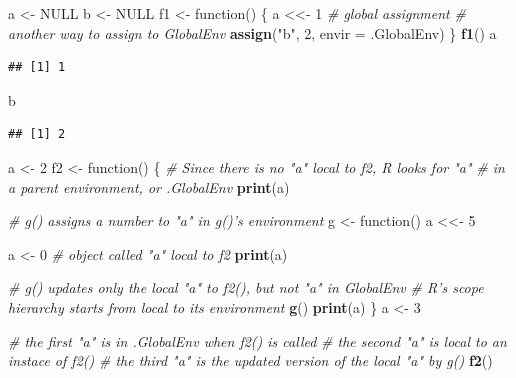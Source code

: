 \documentclass[]{book}
\newenvironment{Shaded}{\begin{snugshade}}{\end{snugshade}}
\newcommand{\KeywordTok}[1]{\textcolor[rgb]{0.13,0.29,0.53}{\textbf{{#1}}}}
\newcommand{\DataTypeTok}[1]{\textcolor[rgb]{0.13,0.29,0.53}{{#1}}}
\newcommand{\DecValTok}[1]{\textcolor[rgb]{0.00,0.00,0.81}{{#1}}}
\newcommand{\StringTok}[1]{\textcolor[rgb]{0.31,0.60,0.02}{{#1}}}
\newcommand{\CommentTok}[1]{\textcolor[rgb]{0.56,0.35,0.01}{\textit{{#1}}}}
\newcommand{\OtherTok}[1]{\textcolor[rgb]{0.56,0.35,0.01}{{#1}}}
\newcommand{\NormalTok}[1]{{#1}}
\theoremstyle{definition}
\theoremstyle{definition}
\theoremstyle{remark}
\begin{document}
\begin{Shaded}
\begin{Highlighting}[]
\NormalTok{a <-}\StringTok{ }\OtherTok{NULL}
\NormalTok{b <-}\StringTok{ }\OtherTok{NULL}
\NormalTok{f1 <-}\StringTok{ }\NormalTok{function() \{}
        \NormalTok{a <<-}\StringTok{ }\DecValTok{1}  \CommentTok{# global assignment}
        \CommentTok{# another way to assign to GlobalEnv }
        \KeywordTok{assign}\NormalTok{(}\StringTok{"b"}\NormalTok{, }\DecValTok{2}\NormalTok{, }\DataTypeTok{envir =} \NormalTok{.GlobalEnv)  }
      \NormalTok{\}}
\KeywordTok{f1}\NormalTok{() }
\NormalTok{a}
\end{Highlighting}
\end{Shaded}

\begin{verbatim}
## [1] 1
\end{verbatim}

\begin{Shaded}
\begin{Highlighting}[]
\NormalTok{b}
\end{Highlighting}
\end{Shaded}

\begin{verbatim}
## [1] 2
\end{verbatim}

\begin{Shaded}
\begin{Highlighting}[]
\NormalTok{a <-}\StringTok{ }\DecValTok{2}
\NormalTok{f2 <-}\StringTok{ }\NormalTok{function() \{}
        \CommentTok{# Since there is no "a" local to f2, R looks for "a" }
        \CommentTok{# in a parent environment, or .GlobalEnv  }
        \KeywordTok{print}\NormalTok{(a) }
        
        \CommentTok{# g() assigns a number to "a" in g()'s environment }
        \NormalTok{g <-}\StringTok{ }\NormalTok{function() a <<-}\StringTok{ }\DecValTok{5}
        
        \NormalTok{a <-}\StringTok{ }\DecValTok{0}  \CommentTok{#  object called "a" local to f2   }
        \KeywordTok{print}\NormalTok{(a)}
        
        \CommentTok{# g() updates only the local "a" to f2(), but not "a" in GlobalEnv }
        \CommentTok{# R's scope hierarchy starts from local to its environment  }
        \KeywordTok{g}\NormalTok{()   }
        \KeywordTok{print}\NormalTok{(a)}
      \NormalTok{\}}
\NormalTok{a <-}\StringTok{ }\DecValTok{3}

\CommentTok{# the first "a" is in .GlobalEnv when f2() is called}
\CommentTok{# the second "a" is local to an instace of f2()}
\CommentTok{# the third "a" is the updated version of the local "a" by g() }
\KeywordTok{f2}\NormalTok{() }
\end{Highlighting}
\end{Shaded}
\end{document}
